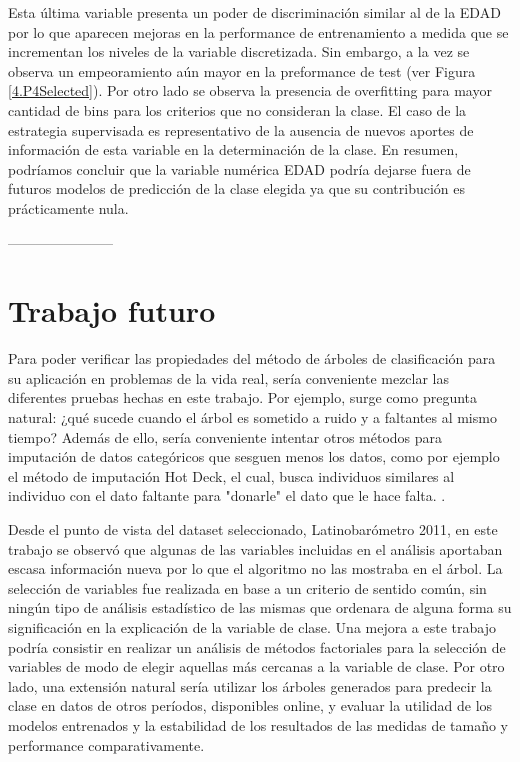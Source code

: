 \documentclass[]{article}
\begin{document}
Esta última variable presenta un poder de discriminación similar al de la EDAD por lo que aparecen mejoras en la performance de entrenamiento a medida que se incrementan los niveles de la variable discretizada. Sin embargo, a la vez se observa un empeoramiento aún mayor en la preformance de test (ver Figura  \ref{4.P4Selected}). Por otro lado se observa la presencia de overfitting para mayor cantidad de bins para los criterios que no consideran la clase. El caso de la estrategia supervisada es representativo de la ausencia de nuevos aportes de información de esta variable en la determinación de la clase. En resumen, podríamos concluir que la variable numérica EDAD podría dejarse fuera de futuros modelos de predicción de la clase elegida ya que su contribución es prácticamente nula.


-----------------------
\section*{Trabajo futuro}
Para poder verificar las propiedades del método de árboles de clasificación para su aplicación en problemas de la vida real, sería conveniente mezclar las diferentes pruebas hechas en este trabajo. Por ejemplo, surge como pregunta natural: ¿qué sucede cuando el árbol es sometido a ruido y a faltantes al mismo tiempo? Además de ello, sería conveniente intentar otros métodos para imputación de datos categóricos que sesguen menos los datos, como por ejemplo el método de imputación Hot Deck, el cual, busca individuos similares al individuo con el dato faltante para "donarle" el dato que le hace falta. \cite{Rodgers1984}.

Desde el punto de vista del dataset seleccionado, Latinobarómetro 2011, en este trabajo se observó que algunas de las variables incluidas en el análisis aportaban escasa información nueva por lo que el algoritmo no las mostraba en el árbol. La selección de variables fue realizada en base a un criterio de sentido común, sin ningún tipo de análisis estadístico de las mismas que ordenara de alguna forma su significación en la explicación de la variable de clase. Una mejora a este trabajo podría consistir en realizar un análisis de métodos factoriales para la selección de variables de modo de elegir aquellas más cercanas a la variable de clase. Por otro lado, una extensión natural sería utilizar los árboles generados para predecir la clase en datos de otros períodos, disponibles online, y evaluar la utilidad de los modelos entrenados y la estabilidad de los resultados de las medidas de tamaño y performance comparativamente.
\end{document}
